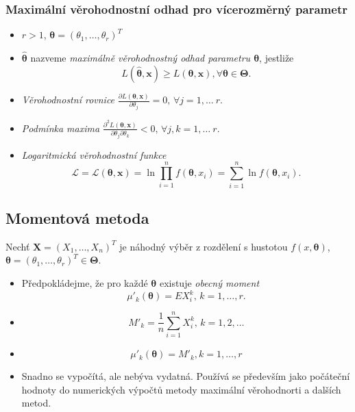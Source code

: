 \documentclass[a4]{report}
\theoremstyle{definition}
\begin{document}
{\subsubsection{Maximální věrohodnostní odhad pro vícerozměrný parametr}
\begin{itemize}
\item $r>1$, $\pmb{\theta}=\left(\theta_1,\ldots,\theta_r\right)^T$
\item $\hat{\pmb{\theta}}$ nazveme \textit{maximálně věrohodnostný odhad parametru $\pmb{\theta}$}, jestliže $$L \left(\hat{\pmb{\theta}}, \mathbf{x} \right) \geq L \left(\pmb{\theta}, \mathbf{x} \right), \forall \pmb{\theta} \in \pmb{\Theta}.$$
\item \textit{Věrohodnostní rovnice} $\frac{\partial L \left(\pmb{\theta}, \mathbf{x} \right)}{\partial \theta_j} = 0,\, \forall j=1,\ldots\ r.$
\item \textit{Podmínka maxima} $\frac{\partial^2 L \left(\pmb{\theta}, \mathbf{x} \right)}{\partial \theta_j \partial \theta_k} < 0,\, \forall j,k=1,\ldots\ r.$
\item \textit{Logaritmická věrohodnostní funkce} $$\mathcal{L} = \mathcal{L} \left(\pmb{\theta}, \mathbf{x} \right) = \ln \prod_{i=1}^{n} f\left(\pmb{\theta},x_i \right) = \sum_{i=1}^{n} \ln f\left(\pmb{\theta},x_i \right).$$
\end{itemize}

\subsection{Momentová metoda}
Nechť $\mathbf{X}=\left(X_1,\ldots,X_n\right)^T$ je náhodný výběr z rozdělení s hustotou $f\left( x,\pmb{\theta}\right)$, $\pmb{\theta}=\left(\theta_1,\ldots,\theta_r\right)^T \in \pmb{\Theta}$.
\begin{itemize}
\item Předpokládejme, že pro každé $\pmb{\theta}$ existuje \textit{obecný moment} $$\mu'_k\left(\pmb{\theta}\right) = EX_{i}^{k}, \, k=1,\ldots,r.$$
\item {} $$M'_k = \frac{1}{n} \sum_{i=1}^{n} X_{i}^{k}, \, k=1,2,\ldots$$
\item {} $$\mu'_k\left(\pmb{\theta}\right)  = M'_k , k=1,\ldots,r$$
\item Snadno se vypočítá, ale nebýva vydatná. Používá se především jako počáteční hodnoty do numerických výpočtů metody maximální věrohodnorti a dalších metod.
\end{itemize}

}
\end{document}
